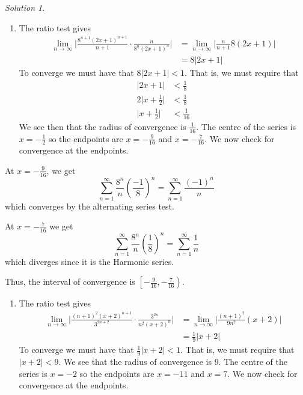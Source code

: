 \documentclass[
]{book}
\providecommand{\tightlist}{%
  \setlength{\itemsep}{0pt}\setlength{\parskip}{0pt}}
\theoremstyle{definition}
\theoremstyle{definition}
\theoremstyle{definition}
\theoremstyle{definition}
\theoremstyle{remark}
\newtheorem*{solution}{Solution}
\begin{document}
\begin{solution}

\begin{enumerate}
\def\labelenumi{\arabic{enumi}.}
\tightlist
\item
  The ratio test gives
  \begin{align*}
  \lim_{n\to \infty}\Bigg| \frac{8^{n+1}(2x+1)^{n+1}}{n+1}\cdot\frac{n}{8^n(2x+1)^n}\Bigg|&=\lim_{n\to \infty}\Bigg|\frac{n}{n+1}8(2x+1)\Bigg|\\
  &=8\Big|2x+1\Big|
  \end{align*}
  To converge we must have that \(8\big|2x+1\big|<1\). That is, we must require that
  \begin{align*}
  \big|2x+1\big|&<\frac{1}{8}\\
  2\Big|x+\frac{1}{2}\Big|&<\frac{1}{8}\\
  \Big|x+\frac{1}{2}\Big|&<\frac{1}{16}
  \end{align*}
  We see then that the radius of convergence is \(\displaystyle \frac{1}{16}\). The centre of the series is \(\displaystyle x=-\frac{1}{2}\) so the endpoints are \(\displaystyle x=-\frac{9}{16}\) and \(\displaystyle x=-\frac{7}{16}\). We now check for convergence at the endpoints.
\end{enumerate}

At \(\displaystyle x=-\frac{9}{16}\), we get \[\sum_{n=1}^{\infty}\frac{8^n}{n}\left(\frac{-1}{8}\right)^n=\sum_{n=1}^{\infty}\frac{(-1)^n}{n}\]
which converges by the alternating series test.

At \(\displaystyle x=-\frac{7}{16}\) we get \[\sum_{n=1}^{\infty}\frac{8^n}{n}\left(\frac{1}{8}\right)^n=\sum_{n=1}^{\infty}\frac{1}{n}\]
which diverges since it is the Harmonic series.

Thus, the interval of convergence is \(\displaystyle\left[-\frac{9}{16},-\frac{7}{16} \right)\).

\begin{enumerate}
\def\labelenumi{\arabic{enumi}.}
\setcounter{enumi}{1}
\tightlist
\item
  The ratio test gives
  \begin{align*}
  \lim_{n\to \infty}\Bigg| \frac{(n+1)^2(x+2)^{n+1}}{3^{2n+2}}\cdot\frac{3^{2n}}{n^2(x+2)^n}\Bigg|&=\lim_{n\to \infty}\Bigg|\frac{(n+1)^2}{9n^2}(x+2)\Bigg|\\
  &=\frac{1}{9}|x+2|
  \end{align*}
  To converge we must have that \(\displaystyle \frac{1}{9}|x+2|<1\). That is, we must require that \(|x+2|<9\). We see that the radius of convergence is 9. The centre of the series is \(x=-2\) so the endpoints are \(x=-11\) and \(x=7\). We now check for convergence at the endpoints.
\end{enumerate}


\end{solution}
\end{document}

